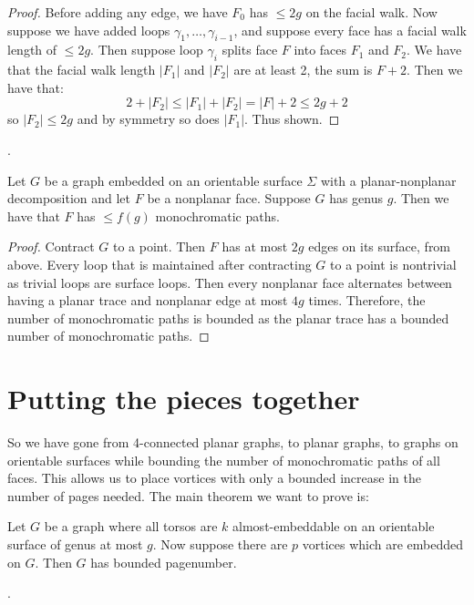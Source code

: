 \begin{proof}
	Before adding any edge, we have \(F_0\) has \(\leq 2g\) on the facial walk. Now suppose we have added loops \(\gamma_1, \ldots, \gamma_{i - 1}\), and suppose every face has a facial walk length of \(\leq 2g\).
	Then suppose loop \(\gamma_i\) splits face \(F\) into faces \(F_1\) and \(F_2\). We have that the facial walk length \(|F_1|\) and \(|F_2|\) are at least 2, the sum is \(F + 2\). Then we have that:
	\begin{equation}
		2 + |F_2| \leq |F_1| + |F_2| = |F| + 2 \leq 2g + 2
	\end{equation}
	so \(|F_2| \leq 2g\) and by symmetry so does \(|F_1|\). Thus shown.
\end{proof}
.

\begin{corollary}\label{corr:orientable_nonplanar_faces}
	Let \(G\) be a graph embedded on an orientable surface \(\Sigma\) with a planar-nonplanar decomposition and let \(F\) be a nonplanar face. Suppose \(G\) has genus \(g\). Then we have that \(F\) has \(\leq f(g)\) monochromatic paths.
\end{corollary}

\begin{proof}
	Contract \(G\) to a point. Then \(F\) has at most \(2g\) edges on its surface, from above. Every loop that is maintained after contracting $G$ to a point is nontrivial as trivial loops are surface loops.
	Then every nonplanar face alternates between having a planar trace and nonplanar edge at most \(4g\) times. Therefore, the number of monochromatic paths is bounded as the planar trace has a bounded number of monochromatic paths.
\end{proof}

\section{Putting the pieces together}
So we have gone from 4-connected planar graphs, to planar graphs, to graphs on orientable surfaces while bounding the number of monochromatic paths of all faces. This allows us to place vortices with only a bounded increase in the number of pages needed.
The main theorem we want to prove is:
\begin{theorem}\label{thm:orientablevortices}
	Let $G$ be a graph where all torsos are $k$ almost-embeddable on an orientable surface of genus at most $g$.  Now suppose there are $p$ vortices which are embedded on $G$. Then $G$ has bounded pagenumber.
\end{theorem}
.

